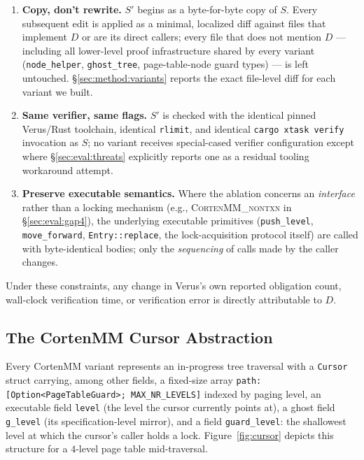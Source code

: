 \documentclass[10pt]{article}
\newcommand{\corten}[1]{\textsc{CortenMM\_#1}}
\newcommand{\vfn}[1]{\texttt{#1}}
\begin{document}
\begin{enumerate}
  \item \textbf{Copy, don't rewrite.} $S'$ begins as a byte-for-byte
    copy of $S$. Every subsequent edit is applied as a minimal,
    localized diff against files that implement $D$ or are its direct
    callers; every file that does not mention $D$ --- including all
    lower-level proof infrastructure shared by every variant
    (\vfn{node\_helper}, \vfn{ghost\_tree}, page-table-node guard
    types) --- is left untouched. \S\ref{sec:method:variants} reports
    the exact file-level diff for each variant we built.
  \item \textbf{Same verifier, same flags.} $S'$ is checked with the
    identical pinned Verus/Rust toolchain, identical \texttt{rlimit},
    and identical \texttt{cargo xtask verify} invocation as $S$; no
    variant receives special-cased verifier configuration except where
    \S\ref{sec:eval:threats} explicitly reports one as a residual
    tooling workaround attempt.
  \item \textbf{Preserve executable semantics.} Where the ablation
    concerns an \emph{interface} rather than a locking mechanism (e.g.,
    \corten{nontxn} in \S\ref{sec:eval:gap4}), the underlying executable
    primitives (\vfn{push\_level}, \vfn{move\_forward},
    \vfn{Entry::replace}, the lock-acquisition protocol itself) are
    called with byte-identical bodies; only the \emph{sequencing} of
    calls made by the caller changes.
\end{enumerate}

Under these constraints, any change in Verus's own reported obligation
count, wall-clock verification time, or verification error is directly
attributable to $D$.

\subsection{The CortenMM Cursor Abstraction}
\label{sec:method:cursor}

Every CortenMM variant represents an in-progress tree traversal with a
\vfn{Cursor} struct carrying, among other fields, a fixed-size array
\vfn{path: [Option<PageTableGuard>; MAX\_NR\_LEVELS]} indexed by paging
level, an executable field \vfn{level} (the level the cursor currently
points at), a ghost field \vfn{g\_level} (its specification-level
mirror), and a field \vfn{guard\_level}: the shallowest level at which
the cursor's caller holds a lock. Figure~\ref{fig:cursor} depicts this
structure for a $4$-level page table mid-traversal.
\end{document}
